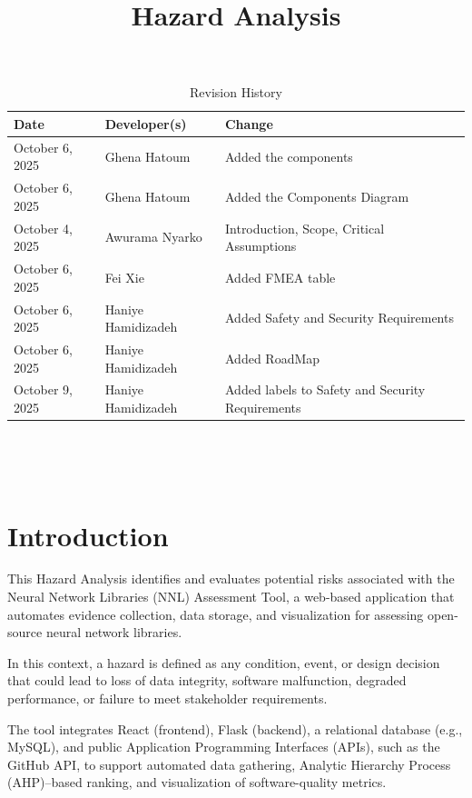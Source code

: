 \documentclass{article}
\title{Hazard Analysis\\\progname}
\author{\authname}
\date{}
\begin{document}
\maketitle
\thispagestyle{empty}


\begin{table}[hp]
\caption{Revision History} \label{TblRevisionHistory}
\begin{tabularx}{\textwidth}{llX}
\toprule
\textbf{Date} & \textbf{Developer(s)} & \textbf{Change}\\
\midrule
October 6, 2025  & Ghena Hatoum & Added the components\\
October 6, 2025  & Ghena Hatoum & Added the Components Diagram\\
October 4, 2025 & Awurama Nyarko & Introduction, Scope, Critical Assumptions\\
October 6, 2025 & Fei Xie & Added FMEA table\\
October 6, 2025 & Haniye Hamidizadeh & Added Safety and Security Requirements\\
October 6, 2025 & Haniye Hamidizadeh & Added RoadMap\\
October 9, 2025 & Haniye Hamidizadeh & Added labels to Safety and Security Requirements\\
\bottomrule
\end{tabularx}
\end{table}

~\newpage

\tableofcontents

~\newpage


\section{Introduction}


This Hazard Analysis identifies and evaluates potential risks associated with
the Neural Network Libraries (NNL) Assessment Tool, a web-based application that
automates evidence collection, data storage, and visualization for assessing
open-source neural network libraries. 

In this context, a hazard is defined as any condition, event, or design
decision that could lead to loss of data integrity, software malfunction,
degraded performance, or failure to meet stakeholder requirements.

The tool integrates React (frontend), Flask (backend), a relational database
(e.g., MySQL), and public Application Programming Interfaces (APIs), such as the
GitHub API, to support automated data gathering, Analytic Hierarchy Process
(AHP)--based ranking, and visualization of software-quality metrics.
\end{document}
